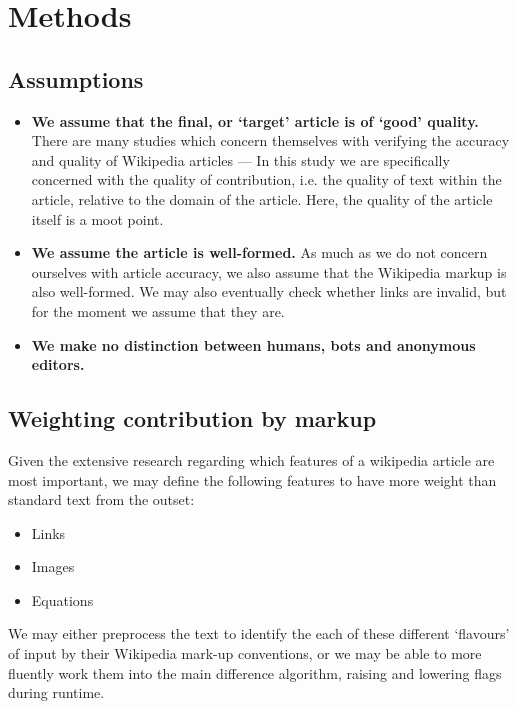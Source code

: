 \section{Methods}
\subsection*{Assumptions}
\begin{itemize}
\item \textbf{We assume that the final, or `target' article is of
  `good' quality.} There are many studies which concern themselves
  with verifying the accuracy and quality of Wikipedia articles --- In
  this study we are specifically concerned with the quality of
  contribution, i.e. the quality of text within the article, relative
  to the domain of the article. Here, the quality of the article
  itself is a moot point.
\item \textbf{We assume the article is well-formed.} As much as we do
  not concern ourselves with article accuracy, we also assume that the
  Wikipedia markup is also well-formed. We may also eventually check
  whether links are invalid, but for the moment we assume that they
  are.
\item \textbf{We make no distinction between humans, bots and
  anonymous editors.}
\end{itemize}

\subsection*{Weighting contribution by markup}
Given the extensive research regarding which features of a wikipedia
article are most important, we may define the following features to
have more weight than standard text from the outset:
\begin{itemize}
\item Links
\item Images
\item Equations
\end{itemize}

We may either preprocess the text to identify the each of these
different `flavours' of input by their Wikipedia mark-up conventions,
or we may be able to more fluently work them into the main difference
algorithm, raising and lowering flags during runtime.

